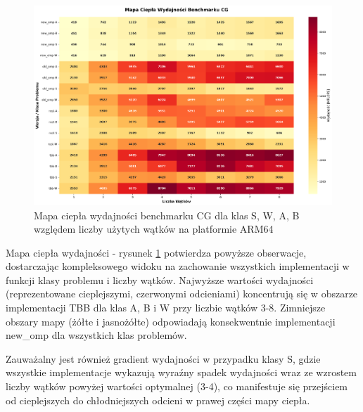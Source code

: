 \begin{figure}[H]
    \centering
    \includegraphics[width=\textwidth]{analiza/images/parallel/cg/arm/cg_mapa_ciepla_wydajnosci.png}
    \caption{Mapa ciepła wydajności benchmarku CG dla klas S, W, A, B względem liczby użytych wątków na platformie ARM64}
    \label{cg_heatmap_wydajnosci}
\end{figure}
Mapa ciepła wydajności - rysunek \ref{cg_heatmap_wydajnosci} potwierdza powyższe obserwacje, dostarczając kompleksowego widoku na zachowanie wszystkich implementacji w funkcji klasy problemu i liczby wątków. Najwyższe wartości wydajności (reprezentowane cieplejszymi, czerwonymi odcieniami) koncentrują się w obszarze implementacji TBB dla klas A, B i W przy liczbie wątków 3-8. Zimniejsze obszary mapy (żółte i jasnożółte) odpowiadają konsekwentnie implementacji new\_omp dla wszystkich klas problemów.

Zauważalny jest również gradient wydajności w przypadku klasy S, gdzie wszystkie implementacje wykazują wyraźny spadek wydajności wraz ze wzrostem liczby wątków powyżej wartości optymalnej (3-4), co manifestuje się przejściem od cieplejszych do chłodniejszych odcieni w prawej części mapy ciepła.


